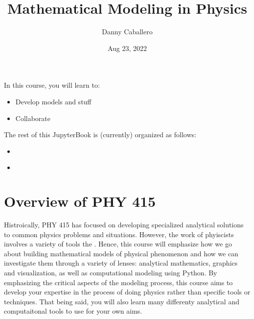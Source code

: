 \documentclass[letterpaper,10pt,english]{jupyterBook}
\title{Mathematical Modeling in Physics}
\date{Aug 23, 2022}
\author{Danny Caballero}
\begin{document}
\pagestyle{empty}
\sphinxmaketitle
\pagestyle{plain}
\sphinxtableofcontents
\pagestyle{normal}
\label{\detokenize{content/intro::doc}}






\sphinxAtStartPar
In this course, you will learn to:
\begin{itemize}
\item {} 
\sphinxAtStartPar
Develop models and stuff

\item {} 
\sphinxAtStartPar
Collaborate

\end{itemize}

\sphinxAtStartPar
The rest of this JupyterBook is (currently) organized as follows:
\begin{itemize}
\item {} 
\sphinxAtStartPar
{\hyperref[\detokenize{content/0_course/syllabus::doc}]{}}

\item {} 
\sphinxAtStartPar
{\hyperref[\detokenize{content/1_modeling/what_is_modeling::doc}]{}}

\end{itemize}

\sphinxstepscope


\chapter{Overview of PHY 415}
\label{\detokenize{content/0_course/syllabus:overview-of-phy-415}}\label{\detokenize{content/0_course/syllabus::doc}}
\sphinxAtStartPar
Histroically, PHY 415 has focused on developing specialized analytical solutions to common physics problems and situations. However, the work of phyiscists involves a variety of tools the . Hence, this course will emphasize how we go about building mathematical models of physical phenomenon and how we can investigate them through a variety of lenses: analytical mathematics, graphics and visualization, as well as computational modeling using Python. By emphasizing the critical aspects of the modeling process, this course aims to develop your expertise in the process of doing physics rather than specific tools or techniques. That being said, you will also learn many differenty analytical and computaitonal tools to use for your own aims.
\end{document}
